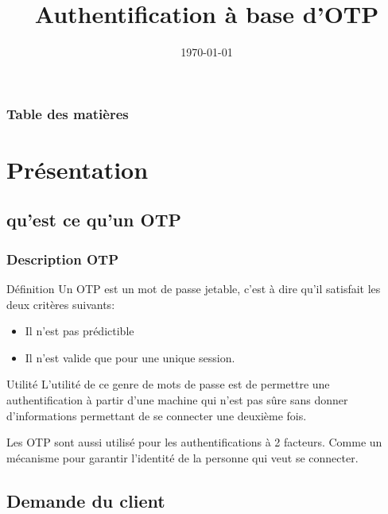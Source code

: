 \documentclass{beamer}
\title[M1SSI]{Authentification \`{a} base d'OTP}
\institute[Universit\'{e} de Rouen] {
Universit\'{e} de Rouen \\
\medskip
}
\date{\today}
\begin{document}
\begin{frame}
\titlepage
\end{frame}

\begin{frame}
\frametitle{Table des mati\`{e}res}
\tableofcontents
\end{frame}

\section{Pr\'{e}sentation}

\subsection{qu'est ce qu'un OTP}

\begin{frame}
\frametitle{Description OTP}
\begin{block}{Définition}
    Un OTP est un mot de passe jetable, c'est à dire qu'il satisfait les deux 
  critères suivants:
  \begin{itemize}
    \item Il n'est pas prédictible
    \item Il n'est valide que pour une unique session.
  \end{itemize}
\end{block}

\begin{block}{Utilité}
    L'utilité de ce genre de mots de passe est de permettre une authentification 
  à partir d'une machine qui n'est pas sûre sans donner d'informations 
  permettant de se connecter une deuxième fois.

    Les OTP sont aussi utilisé pour les authentifications à 2 facteurs. Comme un 
  mécanisme pour garantir l'identité de la personne qui veut se connecter.
\end{block}
\end{frame}

\subsection{Demande du client}
\end{document}
